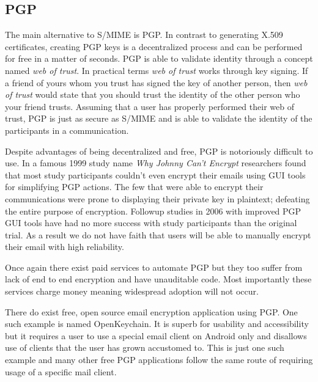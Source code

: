 \documentclass[10pt]{article}
\begin{document}
\begin{multicols}{2}
\subsection{PGP}
\par The main alternative to S/MIME is PGP. In contrast to generating X.509 certificates, creating PGP keys is a decentralized process and can be performed for free in a matter of seconds. PGP is able to validate identity through a concept named \textit{web of trust}. In practical terms \textit{web of trust} works through key signing. If a friend of yours whom you trust has signed the key of another person, then \textit{web of trust} would state that you should trust the identity of the other person who your friend trusts\cite{zimmermann1995official}. Assuming that a user has properly performed their web of trust, PGP is just as secure as S/MIME and is able to validate the identity of the participants in a communication\cite{furnell2013usable}.
\par Despite advantages of being decentralized and free, PGP is notoriously difficult to use. In a famous 1999 study name \textit{Why Johnny Can't Encrypt} researchers found that most study participants couldn't even encrypt their emails using GUI tools for simplifying PGP actions. The few that were able to encrypt their communications were prone to displaying their private key in plaintext; defeating the entire purpose of encryption\cite{whitten1999johnny}. Followup studies in 2006 with improved PGP GUI tools have had no more success with study participants than the original trial\cite{sheng2006johnny}. As a result we do not have faith that users will be able to manually encrypt their email with high reliability.
\par Once again there exist paid services to automate PGP but they too suffer from lack of end to end encryption and have unauditable code\cite{ciphermail-gateway,hushmail,eff-scorecard}. Most importantly these services charge money meaning widespread adoption will not occur. \par There do exist free, open source email encryption application using PGP. One such example is named OpenKeychain. It is superb for usability and accessibility but it requires a user to use a special email client on Android only and disallows use of clients that the user has grown accustomed to\cite{openkeychain}. This is just one such example and many other free PGP applications follow the same route of requiring usage of a specific mail client.

\end{multicols}
\end{document}
